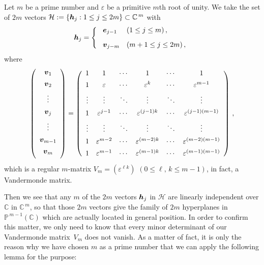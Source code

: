 \documentclass{amsart}
\theoremstyle{definition}
\numberwithin{equation}{section}
\numberwithin{theorem}{section}
\begin{document}
Let $m$ be a prime number and $\varepsilon$ be a primitive $m$th
root of unity. We take the set of $2m$ vectors ${\mathcal
H}:=\{\mbox{\boldmath$h$}_j : 1\leq j \leq 2m\}\subset
\mathbb{C}^{\, m}$ with
\[
\mbox{\boldmath$h$}_j= \left\{ \
\begin{array}{ll}
\mbox{\boldmath$e$}_{j-1} & (1\leq j\leq m)\,, \\[2ex]
\mbox{\boldmath$v$}_{j-m} & (m+1\leq j \leq 2m)\,,
\end{array}
\right.
\]
where
\[
\left(
\begin{array}{c}
\mbox{\boldmath$v$}_{1}     \\[1ex]
\mbox{\boldmath$v$}_{2}     \\[1ex]
\vdots  \\[1ex]
\mbox{\boldmath$v$}_{j} \\[1ex]
\vdots  \\[1ex]
\mbox{\boldmath$v$}_{m-1}   \\[1ex]
\mbox{\boldmath$v$}_{m} \\[1ex]
\end{array} \right)
= \left( \begin{array}{cccccc}
1 & 1 & \cdots & 1 &\cdots& 1\\[1ex]
1 & \varepsilon & \cdots & \varepsilon^k &\cdots&\varepsilon^{m-1}\\[1ex]
\vdots&\vdots&\ddots&\vdots&\ddots&\vdots\\[1ex]
1&\varepsilon^{j-1} &\cdots&\varepsilon^{(j-1) k}&\cdots&\varepsilon^{(j-1) (m-1)}\\[1ex]
\vdots&\vdots&\ddots&\vdots&\ddots&\vdots\\[1ex]
1&\varepsilon^{m-2}&\cdots&\varepsilon^{(m-2)k}&\cdots&\varepsilon^{(m-2)(m-1)}\\[1ex]
1&\varepsilon^{m-1}&\cdots&\varepsilon^{(m-1)k}&\cdots&\varepsilon^{(m-1)(m-1)}
\end{array} \right)\,,
\]
which is a regular $m$-matrix $V_m=(\varepsilon^{\ell k})$ $(0\leq
\ell,\, k\leq m-1)$, in fact, a Vandermonde matrix.

Then we see that any $m$ of the $2m$ vectors
$\mbox{\boldmath$h$}_{j}$ in ${\mathcal H}$ are linearly
independent over $\mathbb{C}$ in $\mathbb{C}^{\, m}$, so that
those $2m$ vectors give the family of $2m$ hyperplanes in
$\mathbb{P}^{\, m-1}(\mathbb{C})$ which are actually located in
general position. In order to confirm this matter, we only need to
know that every minor determinant of our Vandermonde matrix~$V_m$
does not vanish. As a matter of fact, it is only the reason why we
have chosen $m$ as a prime number that we can apply the following
lemma for the purpose:
\end{document}
